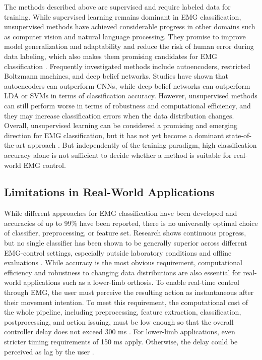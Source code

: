 The methods described above are supervised and require labeled data for training. While supervised learning remains dominant in EMG classification, unsupervised methods have achieved considerable progress in other domains such as computer vision and natural language processing. They promise to improve model generalization and adaptability and reduce the risk of human error during data labeling, which also makes them promising candidates for EMG classification \cite{zhong_deep_2026}. Frequently investigated methods include autoencoders, restricted Boltzmann machines, and deep belief networks. Studies have shown that autoencoders can outperform \acp{CNN}, while deep belief networks can outperform \ac{LDA} or \acp{SVM} in terms of classification accuracy. However, unsupervised methods can still perform worse in terms of robustness and computational efficiency, and they may increase classification errors when the data distribution changes. Overall, unsupervised learning can be considered a promising and emerging direction for EMG classification, but it has not yet become a dominant state-of-the-art approach \cite{li_gesture_2021}. But independently of the training paradigm, high classification accuracy alone is not sufficient to decide whether a method is suitable for real-world EMG control.

\subsection{Limitations in Real-World Applications}
While different approaches for EMG classification have been developed and accuracies of up to 99\% have been reported, there is no universally optimal choice of classifier, preprocessing, or feature set. Research shows continuous progress, but no single classifier has been shown to be generally superior across different EMG-control settings, especially outside laboratory conditions and offline evaluations \cite{yadav_recent_2023}.
While accuracy is the most obvious requirement, computational efficiency and robustness to changing data distributions are also essential for real-world applications such as a lower-limb orthosis. 
To enable real-time control through EMG, the user must perceive the resulting action as instantaneous after their movement intention. To meet this requirement, the computational cost of the whole pipeline, including preprocessing, feature extraction, classification, postprocessing, and action issuing, must be low enough so that the overall controller delay does not exceed 300 ms \cite{jaramillo-yanez_real-time_2020}. For lower-limb applications, even stricter timing requirements of 150 ms apply. Otherwise, the delay could be perceived as lag by the user \cite{cimolato_emg-driven_2022}.

